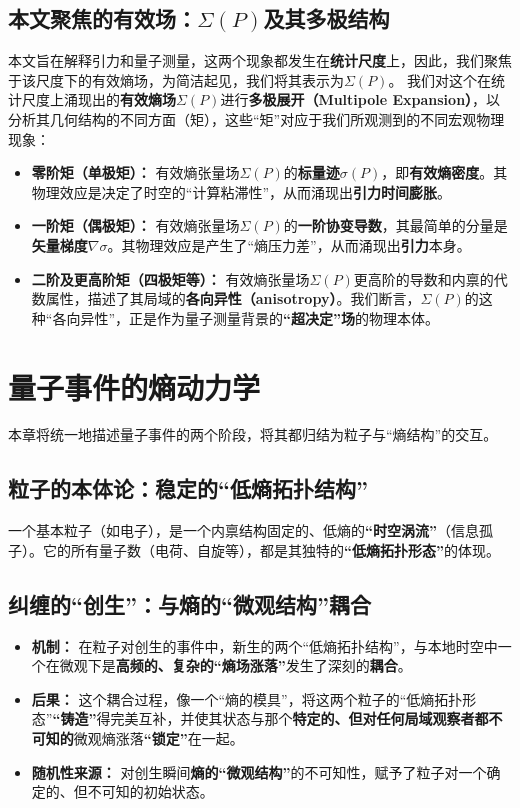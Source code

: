 \documentclass[12pt]{article}
\begin{document}
\subsection{本文聚焦的有效场：$\Sigma(P)$及其多极结构}
本文旨在解释引力和量子测量，这两个现象都发生在\textbf{统计尺度}上，因此，我们聚焦于该尺度下的有效熵场，为简洁起见，我们将其表示为$\Sigma(P)$。
我们对这个在统计尺度上涌现出的\textbf{有效熵场$\Sigma(P)$}进行\textbf{多极展开（Multipole Expansion）}，以分析其几何结构的不同方面（矩），这些``矩''对应于我们所观测到的不同宏观物理现象：

\begin{itemize}
    \item   \textbf{零阶矩（单极矩）：} 有效熵张量场$\Sigma(P)$的\textbf{标量迹$\sigma(P)$}，即\textbf{有效熵密度}。其物理效应是决定了时空的``计算粘滞性''，从而涌现出\textbf{引力时间膨胀}。
    
    \item   \textbf{一阶矩（偶极矩）：} 有效熵张量场$\Sigma(P)$的\textbf{一阶协变导数}，其最简单的分量是\textbf{矢量梯度$\nabla\sigma$}。其物理效应是产生了``熵压力差''，从而涌现出\textbf{引力}本身。
    
    \item   \textbf{二阶及更高阶矩（四极矩等）：} 有效熵张量场$\Sigma(P)$更高阶的导数和内禀的代数属性，描述了其局域的\textbf{各向异性（anisotropy）}。我们断言，$\Sigma(P)$的这种``各向异性''，正是作为量子测量背景的\textbf{``超决定''场}的物理本体。
\end{itemize}


\section{量子事件的熵动力学}

本章将统一地描述量子事件的两个阶段，将其都归结为粒子与``熵结构''的交互。

\subsection{粒子的本体论：稳定的``低熵拓扑结构''}
一个基本粒子（如电子），是一个内禀结构固定的、低熵的\textbf{``时空涡流''}（信息孤子）。它的所有量子数（电荷、自旋等），都是其独特的\textbf{``低熵拓扑形态''}的体现。

\subsection{纠缠的``创生''：与熵的``微观结构''耦合}
\begin{itemize}
    \item   \textbf{机制：} 在粒子对创生的事件中，新生的两个``低熵拓扑结构''，与本地时空中一个在微观下是\textbf{高频的、复杂的``熵场涨落''}发生了深刻的\textbf{耦合}。
    \item   \textbf{后果：} 这个耦合过程，像一个``熵的模具''，将这两个粒子的``低熵拓扑形态''\textbf{``铸造''}得完美互补，并使其状态与那个\textbf{特定的、但对任何局域观察者都不可知的}微观熵涨落\textbf{``锁定''}在一起。
    \item   \textbf{随机性来源：} 对创生瞬间\textbf{熵的``微观结构''}的不可知性，赋予了粒子对一个确定的、但不可知的初始状态。
\end{itemize}
\end{document}
